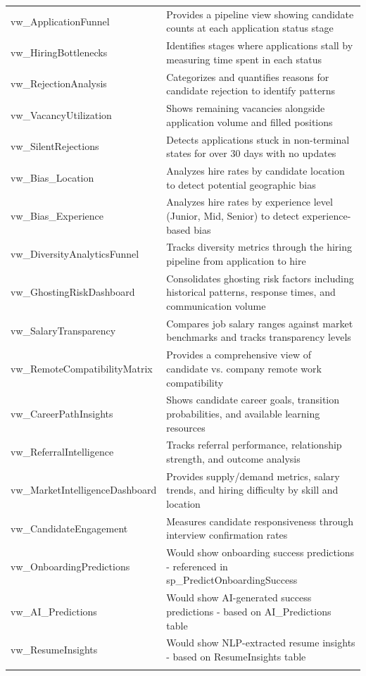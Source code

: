 \documentclass[11pt,a4paper]{article}
\begin{document}
{\begin{tabular}{
  >{\footnotesize\RaggedRight\arraybackslash\columncolor{white}}p{52mm}
  >{\footnotesize\RaggedRight\arraybackslash\columncolor{white}}p{108mm}
}
vw\_ApplicationFunnel & Provides a pipeline view showing candidate counts at each application status stage \\[-2pt]
vw\_HiringBottlenecks & Identifies stages where applications stall by measuring time spent in each status \\[-2pt]
\rowcolor{rowgray}
vw\_RejectionAnalysis & Categorizes and quantifies reasons for candidate rejection to identify patterns \\[-2pt]
vw\_VacancyUtilization & Shows remaining vacancies alongside application volume and filled positions \\[-2pt]
\rowcolor{rowgray}
vw\_SilentRejections & Detects applications stuck in non-terminal states for over 30 days with no updates \\[-2pt]
vw\_Bias\_Location & Analyzes hire rates by candidate location to detect potential geographic bias \\[-2pt]
\rowcolor{rowgray}
vw\_Bias\_Experience & Analyzes hire rates by experience level (Junior, Mid, Senior) to detect experience-based bias \\[-2pt]
vw\_DiversityAnalyticsFunnel & Tracks diversity metrics through the hiring pipeline from application to hire \\[-2pt]
\rowcolor{rowgray}
vw\_GhostingRiskDashboard & Consolidates ghosting risk factors including historical patterns, response times, and communication volume \\[-2pt]
vw\_SalaryTransparency & Compares job salary ranges against market benchmarks and tracks transparency levels \\[-2pt]
\rowcolor{rowgray}
vw\_RemoteCompatibilityMatrix & Provides a comprehensive view of candidate vs. company remote work compatibility \\[-2pt]
vw\_CareerPathInsights & Shows candidate career goals, transition probabilities, and available learning resources \\[-2pt]
\rowcolor{rowgray}
vw\_ReferralIntelligence & Tracks referral performance, relationship strength, and outcome analysis \\[-2pt]
vw\_MarketIntelligenceDashboard & Provides supply/demand metrics, salary trends, and hiring difficulty by skill and location \\[-2pt]
\rowcolor{rowgray}
vw\_CandidateEngagement & Measures candidate responsiveness through interview confirmation rates \\[-2pt]
vw\_OnboardingPredictions & Would show onboarding success predictions - referenced in sp\_PredictOnboardingSuccess \\[-2pt]
\rowcolor{rowgray}
vw\_AI\_Predictions & Would show AI-generated success predictions - based on AI\_Predictions table \\[-2pt]
vw\_ResumeInsights & Would show NLP-extracted resume insights - based on ResumeInsights table \\
\arrayrulecolor{black}\bottomrule
\end{tabular}
}
\end{document}
